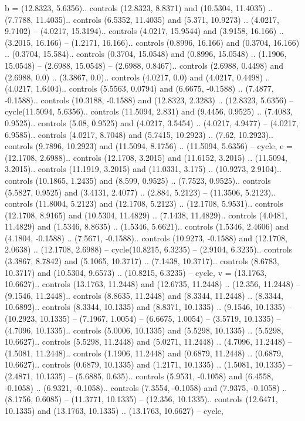 {b} = {(12.8323, 5.6356).. controls (12.8323, 8.8371) and (10.5304, 11.4035) .. (7.7788, 11.4035).. controls (6.5352, 11.4035) and (5.371, 10.9273) .. (4.0217, 9.7102) -- (4.0217, 15.3194).. controls (4.0217, 15.9544) and (3.9158, 16.166) .. (3.2015, 16.166) -- (1.2171, 16.166).. controls (0.8996, 16.166) and (0.3704, 16.166) .. (0.3704, 15.584).. controls (0.3704, 15.0548) and (0.8996, 15.0548) .. (1.1906, 15.0548) -- (2.6988, 15.0548) -- (2.6988, 0.8467).. controls (2.6988, 0.4498) and (2.6988, 0.0) .. (3.3867, 0.0).. controls (4.0217, 0.0) and (4.0217, 0.4498) .. (4.0217, 1.6404).. controls (5.5563, 0.0794) and (6.6675, -0.1588) .. (7.4877, -0.1588).. controls (10.3188, -0.1588) and (12.8323, 2.3283) .. (12.8323, 5.6356) -- cycle(11.5094, 5.6356).. controls (11.5094, 2.831) and (9.4456, 0.9525) .. (7.4083, 0.9525).. controls (5.08, 0.9525) and (4.0217, 3.5454) .. (4.0217, 4.9477) -- (4.0217, 6.9585).. controls (4.0217, 8.7048) and (5.7415, 10.2923) .. (7.62, 10.2923).. controls (9.7896, 10.2923) and (11.5094, 8.1756) .. (11.5094, 5.6356) -- cycle},
{e} = {(12.1708, 2.6988).. controls (12.1708, 3.2015) and (11.6152, 3.2015) .. (11.5094, 3.2015).. controls (11.1919, 3.2015) and (11.0331, 3.175) .. (10.9273, 2.9104).. controls (10.1865, 1.2435) and (8.599, 0.9525) .. (7.7523, 0.9525).. controls (5.5827, 0.9525) and (3.4131, 2.4077) .. (2.884, 5.2123) -- (11.3506, 5.2123).. controls (11.8004, 5.2123) and (12.1708, 5.2123) .. (12.1708, 5.9531).. controls (12.1708, 8.9165) and (10.5304, 11.4829) .. (7.1438, 11.4829).. controls (4.0481, 11.4829) and (1.5346, 8.8635) .. (1.5346, 5.6621).. controls (1.5346, 2.4606) and (4.1804, -0.1588) .. (7.5671, -0.1588).. controls (10.9273, -0.1588) and (12.1708, 2.0638) .. (12.1708, 2.6988) -- cycle(10.8215, 6.3235) -- (2.9104, 6.3235).. controls (3.3867, 8.7842) and (5.1065, 10.3717) .. (7.1438, 10.3717).. controls (8.6783, 10.3717) and (10.5304, 9.6573) .. (10.8215, 6.3235) -- cycle},
{v} = {(13.1763, 10.6627).. controls (13.1763, 11.2448) and (12.6735, 11.2448) .. (12.356, 11.2448) -- (9.1546, 11.2448).. controls (8.8635, 11.2448) and (8.3344, 11.2448) .. (8.3344, 10.6892).. controls (8.3344, 10.1335) and (8.8371, 10.1335) .. (9.1546, 10.1335) -- (10.2923, 10.1335) -- (7.1967, 1.0054) -- (6.6675, 1.0054) -- (3.5719, 10.1335) -- (4.7096, 10.1335).. controls (5.0006, 10.1335) and (5.5298, 10.1335) .. (5.5298, 10.6627).. controls (5.5298, 11.2448) and (5.0271, 11.2448) .. (4.7096, 11.2448) -- (1.5081, 11.2448).. controls (1.1906, 11.2448) and (0.6879, 11.2448) .. (0.6879, 10.6627).. controls (0.6879, 10.1335) and (1.2171, 10.1335) .. (1.5081, 10.1335) -- (2.4871, 10.1335) -- (5.6885, 0.635).. controls (5.9531, -0.1058) and (6.4558, -0.1058) .. (6.9321, -0.1058).. controls (7.3554, -0.1058) and (7.9375, -0.1058) .. (8.1756, 0.6085) -- (11.3771, 10.1335) -- (12.356, 10.1335).. controls (12.6471, 10.1335) and (13.1763, 10.1335) .. (13.1763, 10.6627) -- cycle},
